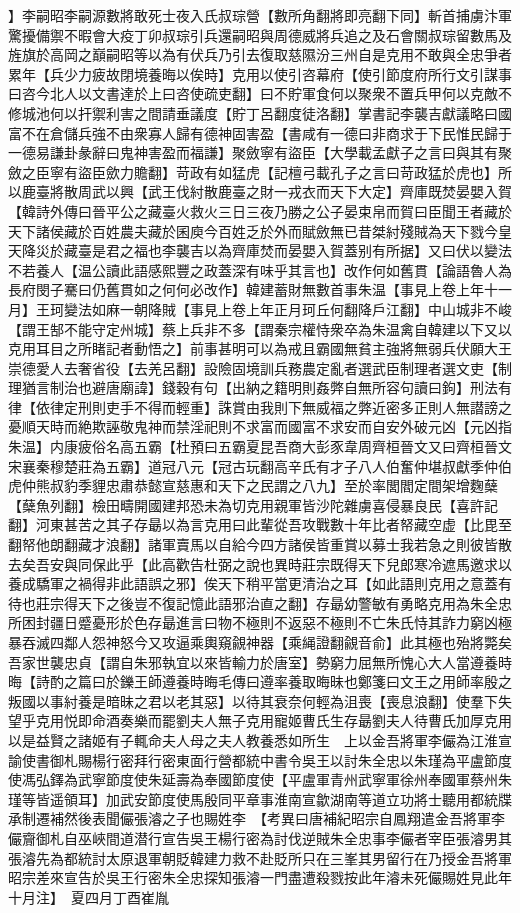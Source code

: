 】李嗣昭李嗣源數將敢死士夜入氏叔琮營【數所角翻將即亮翻下同】斬首捕虜汴軍驚擾備禦不暇會大疫丁卯叔琮引兵還嗣昭與周德威將兵追之及石會關叔琮留數馬及旌旗於高岡之巔嗣昭等以為有伏兵乃引去復取慈隰汾三州自是克用不敢與全忠爭者累年【兵少力疲故閉境養晦以俟時】克用以使引咨幕府【使引節度府所行文引謀事曰咨今北人以文書達於上曰咨使疏吏翻】曰不貯軍食何以聚衆不置兵甲何以克敵不修城池何以扞禦利害之間請垂議度【貯丁呂翻度徒洛翻】掌書記李襲吉獻議略曰國富不在倉儲兵強不由衆寡人歸有德神固害盈【書咸有一德曰非商求于下民惟民歸于一德易謙卦彖辭曰鬼神害盈而福謙】聚斂寧有盜臣【大學載孟獻子之言曰與其有聚斂之臣寧有盜臣歛力贍翻】苛政有如猛虎【記檀弓載孔子之言曰苛政猛於虎也】所以鹿臺將散周武以興【武王伐紂散鹿臺之財一戎衣而天下大定】齊庫既焚晏嬰入賀【韓詩外傳曰晉平公之藏臺火救火三日三夜乃勝之公子晏束帛而賀曰臣聞王者藏於天下諸侯藏於百姓農夫藏於囷庾今百姓乏於外而賦斂無已昔桀紂殘賊為天下戮今皇天降災於藏臺是君之福也李襲吉以為齊庫焚而晏嬰入賀蓋别有所据】又曰伏以變法不若養人【温公讀此語感熙豐之政蓋深有味乎其言也】改作何如舊貫【論語魯人為長府閔子騫曰仍舊貫如之何何必改作】韓建蓄財無數首事朱温【事見上卷上年十一月】王珂變法如麻一朝降賊【事見上卷上年正月珂丘何翻降戶江翻】中山城非不峻【謂王郜不能守定州城】蔡上兵非不多【謂秦宗權恃衆卒為朱温禽自韓建以下又以克用耳目之所睹記者動悟之】前事甚明可以為戒且霸國無貧主強將無弱兵伏願大王崇德愛人去奢省役【去羌呂翻】設險固境訓兵務農定亂者選武臣制理者選文吏【制理猶言制治也避唐廟諱】錢穀有句【出納之籍明則姦弊自無所容句讀曰鉤】刑法有律【依律定刑則吏手不得而輕重】誅賞由我則下無威福之弊近密多正則人無譛謗之憂順天時而絶欺誣敬鬼神而禁淫祀則不求富而國富不求安而自安外破元凶【元凶指朱温】内康疲俗名高五霸【杜預曰五霸夏昆吾商大彭豕韋周齊桓晉文又曰齊桓晉文宋襄秦穆楚莊為五霸】道冠八元【冠古玩翻高辛氏有才子八人伯奮仲堪叔獻季仲伯虎仲熊叔豹季貍忠肅恭懿宣慈惠和天下之民謂之八九】至於率閭閻定間架增麴蘖【蘖魚列翻】檢田疇開國建邦恐未為切克用親軍皆沙陀雜虜喜侵暴良民【喜許記翻】河東甚苦之其子存朂以為言克用曰此輩從吾攻戰數十年比者帑藏空虚【比毘至翻帑他朗翻藏才浪翻】諸軍賣馬以自給今四方諸侯皆重賞以募士我若急之則彼皆散去矣吾安與同保此乎【此高歡告杜弼之說也異時莊宗既得天下兒郎寒冷遮馬邀求以養成驕軍之禍得非此語誤之邪】俟天下稍平當更清治之耳【如此語則克用之意蓋有待也莊宗得天下之後豈不復記憶此語邪治直之翻】存朂幼警敏有勇略克用為朱全忠所困封疆日蹙憂形於色存朂進言曰物不極則不返惡不極則不亡朱氏恃其詐力窮凶極暴吞滅四鄰人怨神怒今又攻逼乘輿窺覦神器【乘䋲證翻覦音俞】此其極也殆將斃矣吾家世襲忠貞【謂自朱邪執宜以來皆輸力於唐室】勢窮力屈無所愧心大人當遵養時晦【詩酌之篇曰於鑠王師遵養時晦毛傳曰遵率養取晦昧也鄭箋曰文王之用師率殷之叛國以事紂養是暗昧之君以老其惡】以待其衰奈何輕為沮喪【喪息浪翻】使羣下失望乎克用悦即命酒奏樂而罷劉夫人無子克用寵姬曹氏生存朂劉夫人待曹氏加厚克用以是益賢之諸姬有子輒命夫人母之夫人教養悉如所生　上以金吾將軍李儼為江淮宣諭使書御札賜楊行密拜行密東面行營都統中書令吳王以討朱全忠以朱瑾為平盧節度使馮弘鐸為武寧節度使朱延壽為奉國節度使【平盧軍青州武寧軍徐州奉國軍蔡州朱瑾等皆遥領耳】加武安節度使馬殷同平章事淮南宣歙湖南等道立功將士聽用都統牒承制遷補然後表聞儼張濬之子也賜姓李　【考異曰唐補紀昭宗自鳳翔遣金吾將軍李儼齎御札自巫峽間道潜行宣告吳王楊行密為討伐逆賊朱全忠事李儼者宰臣張濬男其張濬先為都統討太原退軍朝貶韓建力救不赴貶所只在三峯其男留行在乃授金吾將軍昭宗差來宣告於吳王行密朱全忠探知張濬一門盡遭殺戮按此年濬未死儼賜姓見此年十月注】　夏四月丁酉崔胤